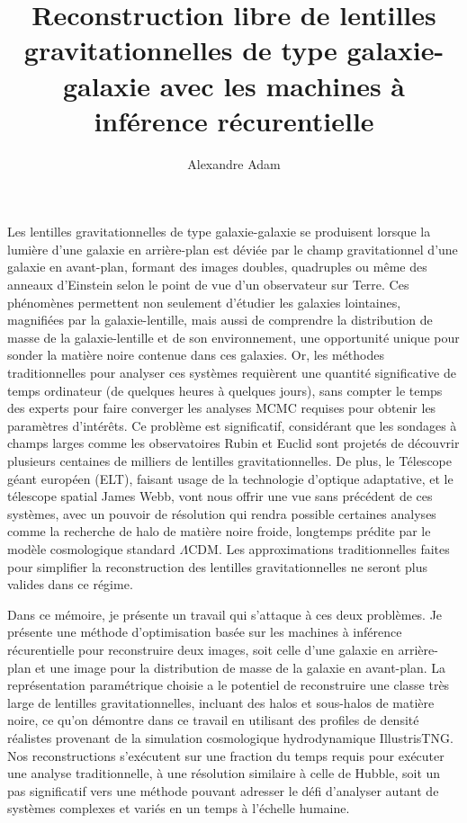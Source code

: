 \documentclass[
  normalmargins,
  11pt,
  openany,
  onehalfspacing,
]{ut-thesis}
\author{Alexandre Adam}
\title{Reconstruction libre de lentilles gravitationnelles de type galaxie-galaxie avec les machines à inférence récurentielle}
\begin{document}
  \frontmatter
    \maketitle


    \begin{resume}
	Les lentilles gravitationnelles de type galaxie-galaxie se produisent lorsque la lumière d'une galaxie 
	en arrière-plan est déviée par le champ gravitationnel d'une galaxie en avant-plan, formant 
	des images doubles, quadruples ou même des anneaux d'Einstein selon le point de vue d'un observateur sur Terre. 
	Ces phénomènes permettent non seulement 
	d'étudier les galaxies lointaines, magnifiées par la galaxie-lentille, mais aussi de comprendre la distribution 
	de masse de la galaxie-lentille et de son environnement, une opportunité unique pour 
	sonder la matière noire contenue dans ces galaxies. 
	Or, les méthodes traditionnelles pour analyser ces systèmes requièrent une quantité 
	significative de temps ordinateur (de quelques heures à quelques jours), sans compter le temps des 
	experts pour faire converger les analyses MCMC requises pour obtenir les paramètres d'intérêts. 
	Ce problème est significatif, considérant que 
	les sondages à champs larges comme les observatoires Rubin et Euclid sont projetés de découvrir plusieurs 
	centaines de milliers de lentilles gravitationnelles.  
	De plus, le Télescope géant européen (ELT), faisant usage de la technologie d'optique adaptative, 
	et le télescope spatial James Webb, vont nous offrir une vue sans précédent de ces systèmes, avec un 
	pouvoir de résolution qui rendra possible certaines analyses comme la recherche de halo de matière noire froide, 
	longtemps prédite par le modèle cosmologique standard $\Lambda$CDM. Les approximations traditionnelles faites pour 
	simplifier la reconstruction des lentilles gravitationnelles ne seront plus valides dans ce régime.

	Dans ce mémoire, je présente un travail qui s'attaque à ces deux problèmes. Je présente une 
	méthode d'optimisation basée sur les machines à inférence récurentielle pour reconstruire 
	deux images, soit celle d'une galaxie en arrière-plan et une image pour la distribution de masse 
	de la galaxie en avant-plan. La représentation paramétrique choisie a le potentiel de reconstruire 
	une classe très large de lentilles gravitationnelles, incluant des halos et sous-halos de matière noire, 
	ce qu'on démontre dans ce travail en utilisant des profiles de densité réalistes provenant de 
	la simulation cosmologique hydrodynamique IllustrisTNG. 
	Nos reconstructions s'exécutent sur une fraction du temps requis pour exécuter une analyse traditionnelle, à 
	une résolution similaire à celle de Hubble, soit un pas 
	significatif vers une méthode pouvant adresser le défi d'analyser autant de systèmes complexes et variés en 
	un temps à l'échelle humaine.

    \end{resume}
\end{document}
